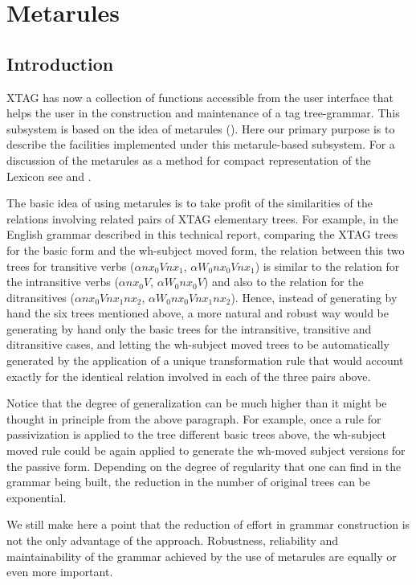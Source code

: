 \chapter{Metarules}
\label{metarules}

\section{Introduction}

XTAG has now a collection of functions accessible from the user interface that
helps the user in the construction and maintenance of a tag tree-grammar.
This subsystem is based on the idea of metarules (\cite{becker93}).
Here our primary
purpose is to describe the facilities implemented under this 
metarule-based subsystem.
For a discussion of the metarules as a method for compact representation 
of the Lexicon see \cite{becker93} and \cite{srini94}.

The basic idea of using metarules is to take profit of the similarities of the
relations involving related pairs of XTAG elementary trees. 
For example, in the English grammar described in this technical report,
comparing the XTAG trees for the basic form and the 
wh-subject moved form, the relation between this two trees for transitive verbs
($\alpha nx_0Vnx_1$, $\alpha W_0nx_0Vnx_1$) is similar to the relation for the
intransitive verbs ($\alpha nx_0V$, $\alpha W_0nx_0V$) and also to the 
relation for the ditransitives ($\alpha nx_0Vnx_1nx_2$, 
$\alpha W_0nx_0Vnx_1nx_2$). Hence, instead of generating by hand the six trees 
mentioned above, a more natural and robust way would be generating by hand 
only the basic trees for the intransitive, transitive and ditransitive cases, 
and letting the wh-subject moved trees to be automatically generated by the
application of a unique transformation rule that would account exactly for
the identical relation involved in each of the three pairs above.

Notice that the degree of generalization can be much higher than it might be
thought in principle from the above paragraph. For example, once a rule for
passivization is applied to the tree different basic trees above, the 
wh-subject moved rule could be again applied to generate the wh-moved subject
versions for the passive form. Depending on the degree of regularity that one
can find in the grammar being built, the reduction in the number of original
trees can be exponential. 

We still make here a point that the reduction of effort in grammar construction
is not the only advantage of the approach. Robustness, 
reliability and maintainability of the grammar achieved by the use of  
metarules are equally or even more important.

